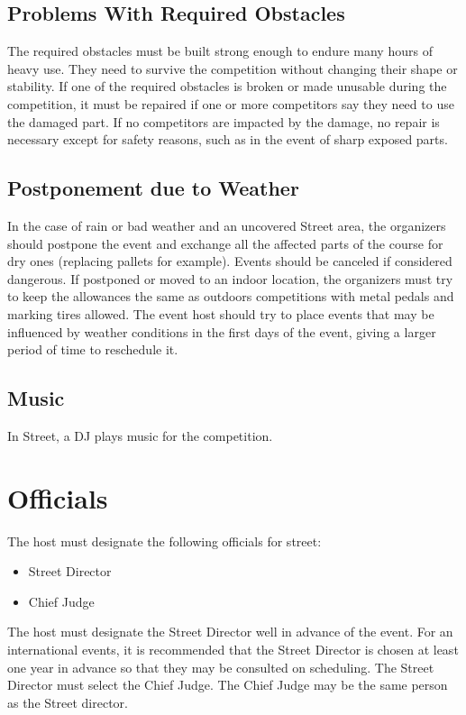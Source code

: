 \subsection{Problems With Required Obstacles}
The required obstacles must be built strong enough to endure many hours of heavy use.
They need to survive the competition without changing their shape or stability.
If one of the required obstacles is broken or made unusable during the competition, it must be repaired if one or more competitors say they need to use the damaged part.
If no competitors are impacted by the damage, no repair is necessary except for safety reasons, such as in the event of sharp exposed parts.

\subsection{Postponement due to Weather}

In the case of rain or bad weather and an uncovered Street area, the organizers should postpone the event and exchange all the affected parts of the course for dry ones (replacing pallets for example).
Events should be canceled if considered dangerous.
If postponed or moved to an indoor location, the organizers must try to keep the allowances the same as outdoors competitions with metal pedals and marking tires allowed.
The event host should try to place events that may be influenced by weather conditions in the first days of the event, giving a larger period of time to reschedule it.

\subsection{Music}
In Street, a DJ plays music for the competition.

\section{Officials}

The host must designate the following officials for street:
\begin{itemize}
\item Street Director
\item Chief Judge
\end{itemize}

The host must designate the Street Director well in advance of the event.
For an international events, it is recommended that the Street Director is chosen at least one year in advance so that they may be consulted on scheduling.
The Street Director must select the Chief Judge.
The Chief Judge may be the same person as the Street director.

